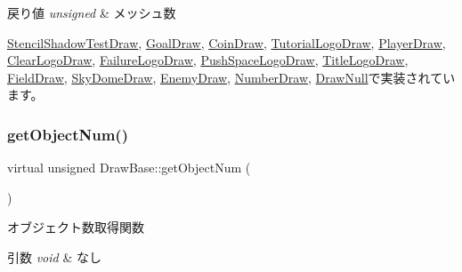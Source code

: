 \begin{DoxyRetVals}{戻り値}
{\em unsigned} & メッシュ数 \\
\hline
\end{DoxyRetVals}


\mbox{\hyperlink{class_stencil_shadow_test_draw_a285b3045ff5cc34b6b2b991cca434bb3}{Stencil\+Shadow\+Test\+Draw}}, \mbox{\hyperlink{class_goal_draw_ac80c8da78cda7b15a4ce46f7d7057622}{Goal\+Draw}}, \mbox{\hyperlink{class_coin_draw_a8ebedf2582d53b40016ebd3f0e82c38e}{Coin\+Draw}}, \mbox{\hyperlink{class_tutorial_logo_draw_a0e56784e25f1f83e6ff167280b801aad}{Tutorial\+Logo\+Draw}}, \mbox{\hyperlink{class_player_draw_ac618153d70492f73299c58a50d565431}{Player\+Draw}}, \mbox{\hyperlink{class_clear_logo_draw_a257f34e6f8325580f7df835f20d2ebb4}{Clear\+Logo\+Draw}}, \mbox{\hyperlink{class_failure_logo_draw_a45bb5d0965ca73b06ae0836f27f9b0e3}{Failure\+Logo\+Draw}}, \mbox{\hyperlink{class_push_space_logo_draw_abaa66b6e3c46aa03bae21bad271eebc0}{Push\+Space\+Logo\+Draw}}, \mbox{\hyperlink{class_title_logo_draw_a20a0e0c3569e49eb421ab4b5a65777cd}{Title\+Logo\+Draw}}, \mbox{\hyperlink{class_field_draw_a0894ddd73716f0db8ceed4b7d89f23fd}{Field\+Draw}}, \mbox{\hyperlink{class_sky_dome_draw_a6b281bafa71c058ee83c373ad978e3bb}{Sky\+Dome\+Draw}}, \mbox{\hyperlink{class_enemy_draw_a1d8a943e4b625795bbd5ae614cc38ed1}{Enemy\+Draw}}, \mbox{\hyperlink{class_number_draw_abcd88040b2b6d5dd7d21e8cfd50b1682}{Number\+Draw}}, \mbox{\hyperlink{class_draw_null_a4c566a37d27fac3dcf76c7970443f375}{Draw\+Null}}で実装されています。

\mbox{\label{class_draw_base_a57c010b4386dc09afa124fba81a6e0fc}} 
\subsubsection{\texorpdfstring{get\+Object\+Num()}{getObjectNum()}}
{\footnotesize\ttfamily virtual unsigned Draw\+Base\+::get\+Object\+Num (\begin{DoxyParamCaption}{ }\end{DoxyParamCaption})\hspace{0.3cm}{\ttfamily [pure virtual]}}



オブジェクト数取得関数 


\begin{DoxyParams}{引数}
{\em void} & なし \\
\hline
\end{DoxyParams}

